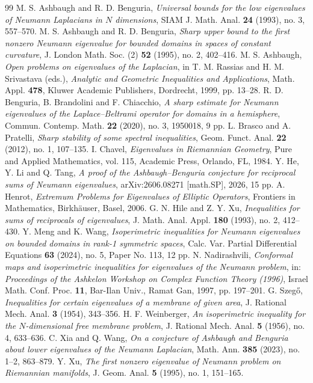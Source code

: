 \documentclass[10pt,a4paper]{amsart}
\begin{document}
\begin{thebibliography}{99}
 M. S. Ashbaugh and R. D. Benguria, \emph{Universal bounds for the low eigenvalues of Neumann Laplacians in $N$ dimensions}, SIAM J. Math. Anal. \textbf{24} (1993), no. 3, 557--570.
 M. S. Ashbaugh and R. D. Benguria, \emph{Sharp upper bound to the first nonzero Neumann eigenvalue for bounded domains in spaces of constant curvature}, J. London Math. Soc. (2) \textbf{52} (1995), no. 2, 402--416.
 M. S. Ashbaugh, \emph{Open problems on eigenvalues of the Laplacian}, in T. M. Rassias and H. M. Srivastava (eds.), \emph{Analytic and Geometric Inequalities and Applications}, Math. Appl. \textbf{478}, Kluwer Academic Publishers, Dordrecht, 1999, pp. 13--28.
 R. D. Benguria, B. Brandolini and F. Chiacchio, \emph{A sharp estimate for Neumann eigenvalues of the Laplace--Beltrami operator for domains in a hemisphere}, Commun. Contemp. Math. \textbf{22} (2020), no. 3, 1950018, 9 pp.
 L. Brasco and A. Pratelli, \emph{Sharp stability of some spectral inequalities}, Geom. Funct. Anal. \textbf{22} (2012), no. 1, 107--135.
 I. Chavel, \emph{Eigenvalues in Riemannian Geometry}, Pure and Applied Mathematics, vol. 115, Academic Press, Orlando, FL, 1984.
 Y. He, Y. Li and Q. Tang, \emph{A proof of the Ashbaugh--Benguria conjecture for reciprocal sums of Neumann eigenvalues}, arXiv:2606.08271 [math.SP], 2026, 15 pp.
 A. Henrot, \emph{Extremum Problems for Eigenvalues of Elliptic Operators}, Frontiers in Mathematics, Birkh\"auser, Basel, 2006.
 G. N. Hile and Z. Y. Xu, \emph{Inequalities for sums of reciprocals of eigenvalues}, J. Math. Anal. Appl. \textbf{180} (1993), no. 2, 412--430.
 Y. Meng and K. Wang, \emph{Isoperimetric inequalities for Neumann eigenvalues on bounded domains in rank-1 symmetric spaces}, Calc. Var. Partial Differential Equations \textbf{63} (2024), no. 5, Paper No. 113, 12 pp.
 N. Nadirashvili, \emph{Conformal maps and isoperimetric inequalities for eigenvalues of the Neumann problem}, in: \emph{Proceedings of the Ashkelon Workshop on Complex Function Theory (1996)}, Israel Math. Conf. Proc. \textbf{11}, Bar-Ilan Univ., Ramat Gan, 1997, pp. 197--201.
 G. Szeg\H{o}, \emph{Inequalities for certain eigenvalues of a membrane of given area}, J. Rational Mech. Anal. \textbf{3} (1954), 343--356.
 H. F. Weinberger, \emph{An isoperimetric inequality for the $N$-dimensional free membrane problem}, J. Rational Mech. Anal. \textbf{5} (1956), no. 4, 633--636.
 C. Xia and Q. Wang, \emph{On a conjecture of Ashbaugh and Benguria about lower eigenvalues of the Neumann Laplacian}, Math. Ann. \textbf{385} (2023), no. 1--2, 863--879.
 Y. Xu, \emph{The first nonzero eigenvalue of Neumann problem on Riemannian manifolds}, J. Geom. Anal. \textbf{5} (1995), no. 1, 151--165.
\end{thebibliography}
\end{document}

